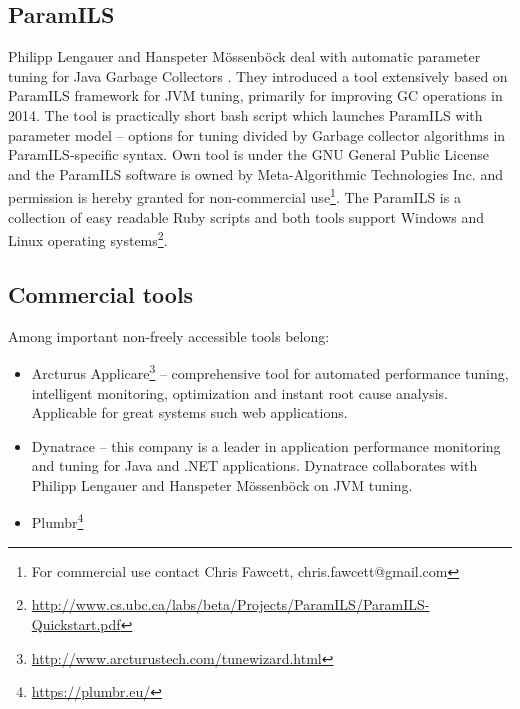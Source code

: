 \documentclass[
  digital, %
  oneside,
  notable, %
  nolof,     %
  nolot     %
]{fithesis3}
\begin{document}
\subsection{ParamILS}
Philipp Lengauer and Hanspeter Mössenböck deal with automatic parameter tuning for Java Garbage Collectors \cite{jvmtuner}. They introduced a tool extensively based on ParamILS framework for JVM tuning, primarily for improving GC operations in 2014. The tool is practically short bash script which launches ParamILS with parameter model -- options for tuning divided by Garbage collector algorithms in ParamILS-specific syntax. Own tool is under the GNU General Public License and the ParamILS software is owned by Meta-Algorithmic Technologies Inc. and permission is hereby granted for non-commercial use\footnote{For commercial use contact Chris Fawcett, chris.fawcett@gmail.com}. \cite{jvmtuner} \cite{paramils} The ParamILS is a collection of easy readable Ruby scripts and both tools support Windows and Linux operating systems\footnote{\url{http://www.cs.ubc.ca/labs/beta/Projects/ParamILS/ParamILS-Quickstart.pdf}}. 



\subsection{Commercial tools}
Among important non-freely accessible tools belong:
\begin{itemize}
	\item Arcturus Applicare\footnote{\url{http://www.arcturustech.com/tunewizard.html}} -- comprehensive tool for automated performance tuning, intelligent monitoring, optimization and instant root cause analysis. Applicable for great systems such web applications.
	\item Dynatrace -- this company is a leader in application performance monitoring and tuning for Java and .NET applications. Dynatrace collaborates with Philipp Lengauer and Hanspeter Mössenböck on JVM tuning. \cite{jvmtuner-boost}
	\item Plumbr\footnote{\url{https://plumbr.eu/}}
\end{itemize}
\end{document}
